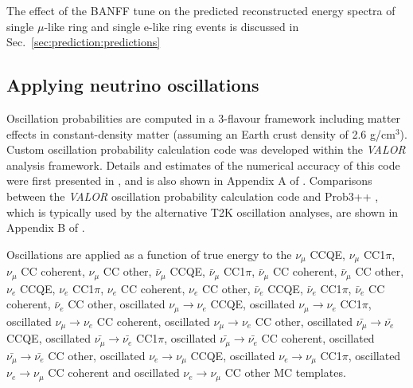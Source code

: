 The effect of the BANFF tune on the predicted reconstructed energy spectra of
single $\mu$-like ring and single e-like ring events is discussed in Sec.\ \ref{sec:prediction:predictions} 




\subsection{Applying neutrino oscillations}
\label{sec:prediction:oscillations}

Oscillation probabilities are computed in a 3-flavour framework including matter effects in constant-density matter
(assuming an Earth crust density of 2.6 g/cm$^{3}$).
Custom oscillation probability calculation code was developed within the {\em VALOR} analysis framework.
Details and estimates of the numerical accuracy of this code were first presented in \cite{OurRun12DisappAnalysis3Flavour},
and is also shown in Appendix A of \cite{OurRun123DisappAnalysis3Flavour}.
Comparisons between the {\em VALOR} oscillation probability calculation code and Prob3++ \cite{Prob3}, 
which is typically used by the alternative T2K oscillation analyses, are shown in Appendix B of \cite{OurRun123DisappAnalysis3Flavour}.

Oscillations are applied as a function of true energy to the 
  $\nu_{\mu}$ CCQE,
  $\nu_{\mu}$ CC1$\pi$, 
  $\nu_{\mu}$ CC coherent, 
  $\nu_{\mu}$ CC other, 
  $\bar{\nu}_{\mu}$ CCQE, 
  $\bar{\nu}_{\mu}$ CC1$\pi$, 
  $\bar{\nu}_{\mu}$ CC coherent, 
  $\bar{\nu}_{\mu}$ CC other, 
  $\nu_{e}$ CCQE, 
  $\nu_{e}$ CC1$\pi$,
  $\nu_{e}$ CC coherent,
  $\nu_{e}$ CC other,
  $\bar{\nu}_{e}$ CCQE, 
  $\bar{\nu}_{e}$ CC1$\pi$,
  $\bar{\nu}_{e}$ CC coherent,
  $\bar{\nu}_{e}$ CC other,
  oscillated $\nu_{\mu} \rightarrow \nu_{e}$ CCQE,
  oscillated $\nu_{\mu} \rightarrow \nu_{e}$ CC1$\pi$,
  oscillated $\nu_{\mu} \rightarrow \nu_{e}$ CC coherent,
  oscillated $\nu_{\mu} \rightarrow \nu_{e}$ CC other,
  oscillated $\bar{\nu_{\mu}} \rightarrow \bar{\nu_{e}}$ CCQE,
  oscillated $\bar{\nu_{\mu}} \rightarrow \bar{\nu_{e}}$ CC1$\pi$,
  oscillated $\bar{\nu_{\mu}} \rightarrow \bar{\nu_{e}}$ CC coherent,
  oscillated $\bar{\nu_{\mu}} \rightarrow \bar{\nu_{e}}$ CC other,
  oscillated $\nu_{e} \rightarrow \nu_{\mu}$ CCQE,
  oscillated $\nu_{e} \rightarrow \nu_{\mu}$ CC1$\pi$,
  oscillated $\nu_{e} \rightarrow \nu_{\mu}$ CC coherent and
  oscillated $\nu_{e} \rightarrow \nu_{\mu}$ CC other
MC templates.

